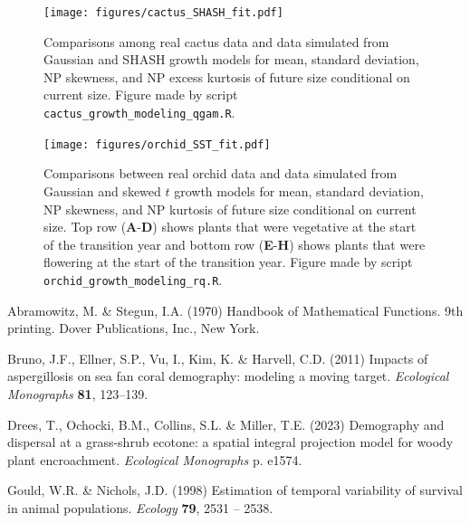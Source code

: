 \documentclass[12pt]{article}
\begin{document}
\begin{spacing}{1.35}
 \begin{figure}[h!]
 	\centering
 	\texttt{[image: figures/cactus\_SHASH\_fit.pdf]}
 	\caption{Comparisons among real cactus data and data simulated from Gaussian and SHASH growth models for mean, standard deviation, NP skewness, and NP excess kurtosis of future size conditional on current size. Figure made by script \texttt{cactus\_growth\_modeling\_qgam.R}.}
 	\label{fig:cactus_fit}
 \end{figure} 

\begin{figure}[h!]
	\centering
	\texttt{[image: figures/orchid\_SST\_fit.pdf]}
	\caption{Comparisons between real orchid data and data simulated from Gaussian and skewed $t$ growth models for mean, standard deviation, NP skewness, and NP kurtosis of future size conditional on current size. Top row (\textbf{A}-\textbf{D}) shows plants that were vegetative at the start of the transition year and bottom row (\textbf{E}-\textbf{H}) shows plants that were flowering at the start of the transition year. Figure made by script \texttt{orchid\_growth\_modeling\_rq.R}.}
	\label{fig:orchid_SST_fit}
\end{figure} 

\clearpage
\newpage 

\begin{thebibliography}{62}
\providecommand{\natexlab}[1]{#1}

Abramowitz, M. \& Stegun, I.A. (1970) {Handbook of Mathematical Functions. 9th printing.}
{D}over Publications, Inc., New York.

Bruno, J.F., Ellner, S.P., Vu, I., Kim, K. \& Harvell, C.D. (2011) Impacts of
  aspergillosis on sea fan coral demography: modeling a moving target.
  \emph{Ecological Monographs} \textbf{81}, 123--139.

Drees, T., Ochocki, B.M., Collins, S.L. \& Miller, T.E. (2023) Demography and
  dispersal at a grass-shrub ecotone: a spatial integral projection model for
  woody plant encroachment. \emph{Ecological Monographs} p. e1574.

Gould, W.R. \& Nichols, J.D. (1998) Estimation of temporal variability of
  survival in animal populations. \emph{Ecology} \textbf{79}, 2531 -- 2538.


\end{thebibliography}
\end{spacing}
\end{document}
